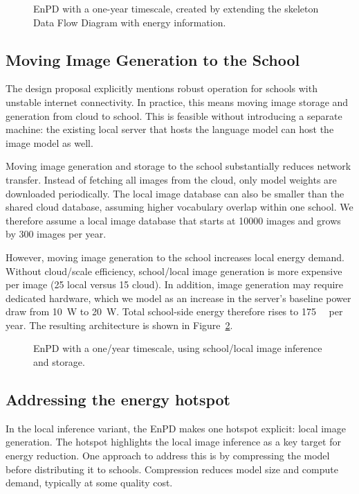 \documentclass[11pt,a4paper]{article}
\begin{document}
\begin{figure}[ht]
  \centering
  \caption{EnPD with a one-year timescale, created by extending the skeleton Data Flow Diagram with energy information.}%
  \label{fig:epd}
\end{figure}

\subsection{Moving Image Generation to the School}
The design proposal explicitly mentions robust operation for schools with unstable internet connectivity.
In practice, this means moving image storage and generation from cloud to school.
This is feasible without introducing a separate machine: the existing local server that hosts the language model can host the image model as well.

Moving image generation and storage to the school substantially reduces network transfer.
Instead of fetching all images from the cloud, only model weights are downloaded periodically.
The local image database can also be smaller than the shared cloud database, assuming higher vocabulary overlap within one school.
We therefore assume a local image database that starts at \num{10000} images and grows by \num{300} images per year.

However, moving image generation to the school increases local energy demand.
Without cloud\-/scale efficiency, school\-/local image generation is more expensive per image (\qty{25}{\watthour} local versus \qty{15}{\watthour} cloud).
In addition, image generation may require dedicated hardware, which we model as an increase in the server's baseline power draw from \qty{10}{\watt} to \qty{20}{\watt}.
Total school-side energy therefore rises to \qty{175}{\kilo\watthour} per year.
The resulting architecture is shown in Figure~\ref{fig:epd-local}.

\begin{figure}[ht]
  \centering
  \caption{EnPD with a one\-/year timescale, using school\-/local image inference and storage.}%
  \label{fig:epd-local}
\end{figure}

\subsection{Addressing the energy hotspot}
In the local inference variant, the EnPD makes one hotspot explicit: local image generation.
The hotspot highlights the local image inference as a key target for energy reduction.
One approach to address this is by compressing the model before distributing it to schools.
Compression reduces model size and compute demand, typically at some quality cost.
\end{document}
